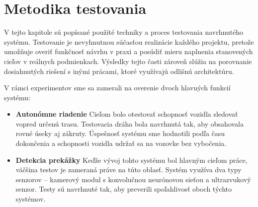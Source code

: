 \section{Metodika testovania}\label{sec:MetodikaTestovania}
V tejto kapitole sú popísané použité techniky a proces testovania navrhnutého systému. Testovanie je nevyhnutnou súčasťou realizácie každého projektu, pretože umožňuje overiť funkčnosť návrhu v praxi a posúdiť mieru naplnenia stanovených cieľov v reálnych podmienkach. Výsledky tejto časti zároveň slúžia na porovnanie dosiahnutých riešení s inými prácami, ktoré využívajú odlišnú architektúru.\par
V rámci experimentov sme sa zamerali na overenie dvoch hlavných funkcií systému:
\begin{itemize}
	\item \textbf{Autonómne riadenie} Cieľom bolo otestovať schopnosť vozidla sledovať vopred určenú trasu. Testovacia dráha bola navrhnutá tak, aby obsahovala rovné úseky aj zákruty. Úspešnosť systému sme hodnotili podľa času dokončenia a schopnosti vozidla udržať sa na vozovke bez vybočenia.
	
	\item \textbf{Detekcia prekážky} Keďže vývoj tohto systému bol hlavným cieľom práce, väčšina testov je zameraná práve na túto oblasť. Systém využíva dva typy senzorov -- kamerový modul s konvolučnou neurónovou sieťou a ultrazvukový senzor. Testy sú navrhnuté tak, aby preverili spoľahlivosť oboch týchto systémov.
\end{itemize}
